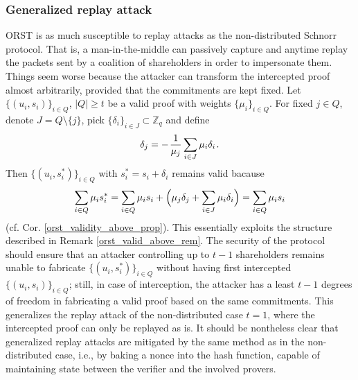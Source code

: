\documentclass[psamsfonts, reqno]{amsart}
\theoremstyle{definition}
\theoremstyle{remark}
\numberwithin{equation}{section}
\begin{document}
\subsubsection{Generalized replay attack}\label{section_generalized_replay_attack}

\textsf{ORST}
is as much susceptible to replay attacks
as the non-distributed Schnorr protocol.
That is, a man-in-the-middle
can passively capture and anytime replay
the packets sent by a coalition
of shareholders in order to impersonate them.
Things seem worse
because the attacker can transform the
intercepted proof
almost arbitrarily,
provided that the commitments are kept fixed.
Let
$\{(u_i, s_i)\}_{i \in Q}$, $|Q| \ge t$ be a
valid proof with weights $\{\mu_i\}_{i \in Q}$.
For fixed $j \in Q$, denote $J = Q \setminus \{j\}$,
pick $\{\delta_i\}_{i \in J} \subset \mathbb{Z}_q$ and define
\vspace{5pt}
\begin{equation*}
\delta_j = -\hspace{1pt} \frac{1}{\mu_j}\sum_{i \in J} \mu_i \delta_i\hspace{1pt}.
\vspace{5pt}
\end{equation*}
Then $\{(u_i, s_i^*)\}_{i \in Q}$ with
$s_i^* = s_i + \delta_i$ remains valid bacause
\vspace{5pt}
\begin{equation*}
\sum_{i \in Q} \mu_i s_i^* =
\sum_{i \in Q} \mu_i s_i + \Big(\mu_j \delta_j + \sum_{i \in J} \mu_i \delta_i\Big) = 
\sum_{i \in Q} \mu_i s_i
\vspace{5pt}
\end{equation*}
\noindent
(cf. Cor. \ref{orst_validity_above_prop}).
This essentially exploits the structure described in
Remark \ref{orst_valid_above_rem}.
The security of the protocol should ensure
that an attacker controlling up to $t-1$ shareholders
remains unable to fabricate $\{(u_i, s_i^*)\}_{i \in Q}$
without having first intercepted $\{(u_i, s_i)\}_{i \in Q}$;
still, in case of interception,
the attacker has a least $t-1$ degrees of freedom
in fabricating a valid proof based on the same commitments.
This generalizes the replay attack of the non-distributed
case $t=1$, where the intercepted proof can only be replayed as is.
It should be nontheless clear that
generalized replay attacks are
mitigated by the same method as in the non-distributed case,
i.e., by baking a nonce into the hash function,
capable of maintaining state between
the verifier and the involved provers.
\end{document}
